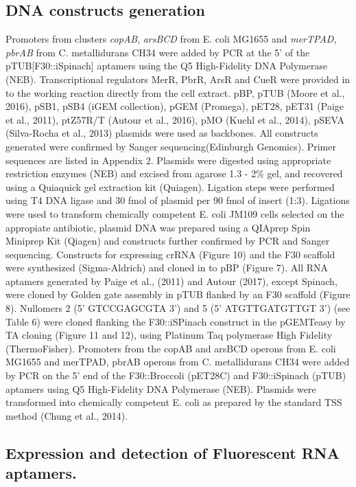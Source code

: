 \subsection*{DNA constructs generation}
Promoters from clusters \textit{copAB}, \textit{arsBCD} from E. coli MG1655 and \textit{merTPAD}, \textit{pbrAB} from C. metallidurans CH34 were added by PCR at the 5’ of the pTUB[F30::iSpinach] aptamers using the Q5 High-Fidelity DNA Polymerase (NEB). Transcriptional regulators MerR, PbrR, ArsR and CueR were provided in to the working reaction directly from the cell extract.
pBP, pTUB (Moore et al., 2016), pSB1, pSB4 (iGEM collection), pGEM (Promega), pET28, pET31 (Paige et
al., 2011), ptZ57R/T (Autour et al., 2016), pMO (Kuehl et al., 2014), pSEVA (Silva-Rocha et al., 2013)
plasmids were used as backbones. All constructs generated were confirmed by Sanger sequencing(Edinburgh Genomics). Primer sequences are listed in Appendix 2. Plasmids were digested using
appropriate restriction enzymes (NEB) and excised from agarose 1.3 - 2\% gel, and recovered using a
Quiaquick gel extraction kit (Quiagen). Ligation steps were performed using T4 DNA ligase and 30 fmol of
plasmid per 90 fmol of insert (1:3). Ligations were used to transform chemically competent E. coli JM109
cells selected on the appropiate antibiotic, plasmid DNA was prepared
using a QIAprep Spin Miniprep Kit
(Qiagen) and constructs further confirmed by PCR and Sanger sequencing.
Constructs for expressing crRNA (Figure 10) and the F30 scaffold were synthesized (Sigma-Aldrich) and
cloned in to pBP (Figure 7). All RNA aptamers generated by Paige et al., (2011) and Autour (2017), except
Spinach, were cloned by Golden gate assembly in pTUB flanked by an F30 scaffold (Figure 8). Nullomers 2
(5’ GTCCGAGCGTA 3’) and 5 (5’ ATGTTGATGTTGT 3’) (see Table 6) were cloned flanking the
F30::iSPinach construct in the pGEMTeasy by TA cloning (Figure 11 and 12), using Platinum Taq
polymerase High Fidelity (ThermoFisher). Promoters from the copAB and arsBCD operons from E. coli
MG1655 and merTPAD, pbrAB operons from C. metallidurans CH34 were added by PCR on the 5’ end of
the F30::Broccoli (pET28C) and F30::iSpinach (pTUB) aptamers using Q5 High-Fidelity DNA Polymerase
(NEB). Plasmids were transformed into chemically competent E. coli as prepared by the standard TSS
method (Chung et al., 2014).

\subsection*{Expression and detection of Fluorescent RNA aptamers.}

